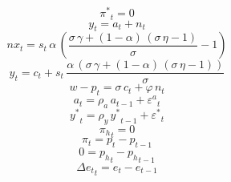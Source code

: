 \begin{dmath}
{{\pi^{*}}}_{t}=0
\end{dmath}
\begin{dmath}
{y}_{t}={a}_{t}+{{n}}_{t}
\end{dmath}
\begin{dmath}
{{nx}}_{t}={s}_{t}\, {\alpha}\, \left(\frac{{\sigma}\, {\gamma}+\left(1-{\alpha}\right)\, \left({\sigma}\, {\eta}-1\right)}{{\sigma}}-1\right)
\end{dmath}
\begin{dmath}
{y}_{t}={c}_{t}+{s}_{t}\, \frac{{\alpha}\, \left({\sigma}\, {\gamma}+\left(1-{\alpha}\right)\, \left({\sigma}\, {\eta}-1\right)\right)}{{\sigma}}
\end{dmath}
\begin{dmath}
{{w-p}}_{t}={\sigma}\, {c}_{t}+{\varphi}\, {{n}}_{t}
\end{dmath}
\begin{dmath}
{a}_{t}={\rho_a}\, {a}_{t-1}+{{\varepsilon^{a}}}_{t}
\end{dmath}
\begin{dmath}
{{y^*}}_{t}={\rho_y}\, {{y^*}}_{t-1}+{{\varepsilon^{*}}}_{t}
\end{dmath}
\begin{dmath}
{{\pi_h}}_{t}=0
\end{dmath}
\begin{dmath}
{{\pi}}_{t}={p}_{t}-{p}_{t-1}
\end{dmath}
\begin{dmath}
0={{p_h}}_{t}-{{p_h}}_{t-1}
\end{dmath}
\begin{dmath}
{\Delta e_t}_{t}={e}_{t}-{e}_{t-1}
\end{dmath}
